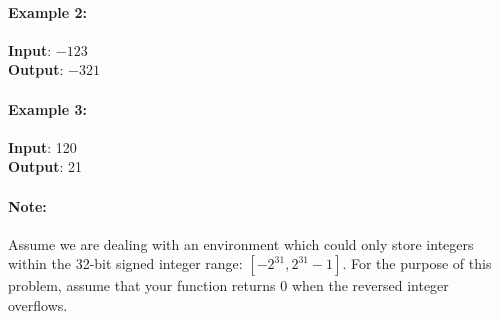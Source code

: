 \documentclass[a4paper,12pt]{article}
\begin{document}
\paragraph{Example 2:}
\begin{flushleft}
\textbf{Input}: $-123$
\\
\textbf{Output}: $-321$
\end{flushleft}
\paragraph{Example 3:}
\begin{flushleft}
\textbf{Input}: 120
\\
\textbf{Output}: 21
\end{flushleft}
\paragraph{Note:}
Assume we are dealing with an environment which could only store integers within the 32-bit signed integer range: $[-2^{31}, 2^{31}-1]$. For the purpose of this problem, assume that your function returns 0 when the reversed integer overflows.
\end{document}
